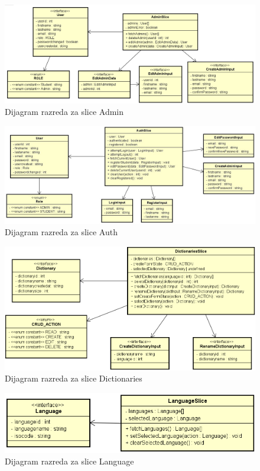\begin{figure}[htp]
	\includegraphics[scale=0.47]{dijagrami/AdminSlice.png}
	\centering
	\caption{Dijagram razreda za slice Admin}
	\label{fig:cls-admin}
\end{figure}

\begin{figure}[htp]
	\includegraphics[scale=0.6]{dijagrami/authSlice.png}
	\centering
	\caption{Dijagram razreda za slice Auth}
	\label{fig:cls-auth}
\end{figure}

\begin{figure}[htp]
	\includegraphics[scale=0.57]{dijagrami/DictionariesSlice.png}
	\centering
	\caption{Dijagram razreda za slice Dictionaries}
	\label{fig:cls-dict}
\end{figure}

\begin{figure}[htp]
	\includegraphics[scale=0.6]{dijagrami/LanguageSlice.png}
	\centering
	\caption{Dijagram razreda za slice Language}
	\label{fig:cls-lang}
\end{figure}

